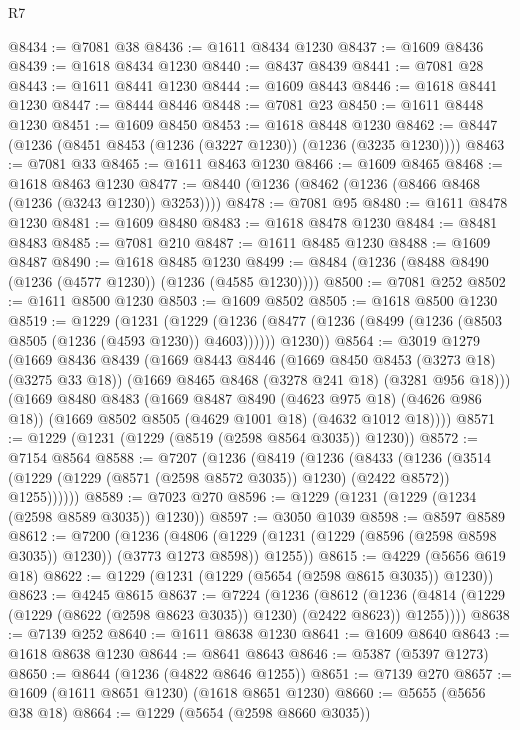 \begin{lexlean}{R7}
\begin{coremodule}
@8434 := @7081 @38
@8436 := @1611 @8434 @1230
@8437 := @1609 @8436
@8439 := @1618 @8434 @1230
@8440 := @8437 @8439
@8441 := @7081 @28
@8443 := @1611 @8441 @1230
@8444 := @1609 @8443
@8446 := @1618 @8441 @1230
@8447 := @8444 @8446
@8448 := @7081 @23
@8450 := @1611 @8448 @1230
@8451 := @1609 @8450
@8453 := @1618 @8448 @1230
@8462 := @8447 (@1236 (@8451 @8453 (@1236 (@3227 @1230)) (@1236 (@3235 @1230))))
@8463 := @7081 @33
@8465 := @1611 @8463 @1230
@8466 := @1609 @8465
@8468 := @1618 @8463 @1230
@8477 := @8440 (@1236 (@8462 (@1236 (@8466 @8468 (@1236 (@3243 @1230)) @3253))))
@8478 := @7081 @95
@8480 := @1611 @8478 @1230
@8481 := @1609 @8480
@8483 := @1618 @8478 @1230
@8484 := @8481 @8483
@8485 := @7081 @210
@8487 := @1611 @8485 @1230
@8488 := @1609 @8487
@8490 := @1618 @8485 @1230
@8499 := @8484 (@1236 (@8488 @8490 (@1236 (@4577 @1230)) (@1236 (@4585 @1230))))
@8500 := @7081 @252
@8502 := @1611 @8500 @1230
@8503 := @1609 @8502
@8505 := @1618 @8500 @1230
@8519 := @1229
    (@1231
      (@1229
        (@1236 (@8477 (@1236 (@8499 (@1236 (@8503 @8505 (@1236 (@4593 @1230)) @4603))))))
        @1230))
@8564 := @3019
    @1279
    (@1669
      @8436
      @8439
      (@1669
        @8443
        @8446
        (@1669 @8450 @8453 (@3273 @18) (@3275 @33 @18))
        (@1669 @8465 @8468 (@3278 @241 @18) (@3281 @956 @18)))
      (@1669
        @8480
        @8483
        (@1669 @8487 @8490 (@4623 @975 @18) (@4626 @986 @18))
        (@1669 @8502 @8505 (@4629 @1001 @18) (@4632 @1012 @18))))
@8571 := @1229 (@1231 (@1229 (@8519 (@2598 @8564 @3035)) @1230))
@8572 := @7154 @8564
@8588 := @7207
    (@1236
      (@8419
        (@1236
          (@8433
            (@1236
              (@3514 (@1229 (@1229 (@8571 (@2598 @8572 @3035)) @1230) (@2422 @8572)) @1255))))))
@8589 := @7023 @270
@8596 := @1229 (@1231 (@1229 (@1234 (@2598 @8589 @3035)) @1230))
@8597 := @3050 @1039
@8598 := @8597 @8589
@8612 := @7200
    (@1236
      (@4806 (@1229 (@1231 (@1229 (@8596 (@2598 @8598 @3035)) @1230)) (@3773 @1273 @8598)) @1255))
@8615 := @4229 (@5656 @619 @18)
@8622 := @1229 (@1231 (@1229 (@5654 (@2598 @8615 @3035)) @1230))
@8623 := @4245 @8615
@8637 := @7224
    (@1236
      (@8612 (@1236 (@4814 (@1229 (@1229 (@8622 (@2598 @8623 @3035)) @1230) (@2422 @8623)) @1255))))
@8638 := @7139 @252
@8640 := @1611 @8638 @1230
@8641 := @1609 @8640
@8643 := @1618 @8638 @1230
@8644 := @8641 @8643
@8646 := @5387 (@5397 @1273)
@8650 := @8644 (@1236 (@4822 @8646 @1255))
@8651 := @7139 @270
@8657 := @1609 (@1611 @8651 @1230) (@1618 @8651 @1230)
@8660 := @5655 (@5656 @38 @18)
@8664 := @1229 (@5654 (@2598 @8660 @3035))

\end{coremodule}
\end{lexlean}
